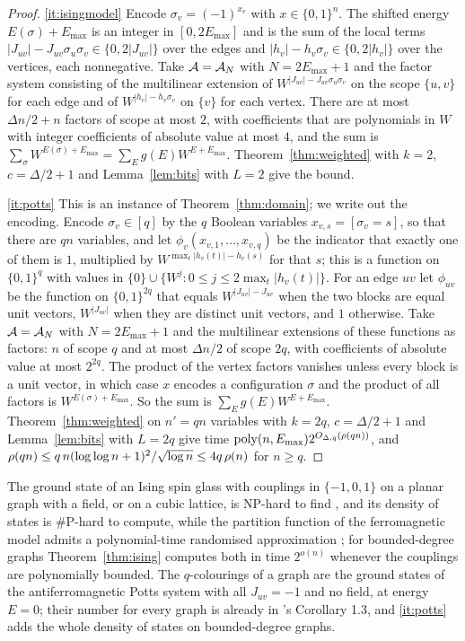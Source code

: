 \begin{proof}
\ref{it:isingmodel} Encode $\sigma_v=(-1)^{x_v}$ with $x\in\{0,1\}^n$. The shifted
energy $E(\sigma)+E_{\max}$ is an integer in $[0,2E_{\max}]$ and is the sum of the
local terms $|J_{uv}|-J_{uv}\sigma_u\sigma_v\in\{0,2|J_{uv}|\}$ over the edges
and $|h_v|-h_v\sigma_v\in\{0,2|h_v|\}$ over the vertices, each nonnegative.
Take $\mathcal{A}=\mathcal{A}_N$ with $N=2E_{\max}+1$ and the factor system consisting of the
multilinear extension of $W^{|J_{uv}|-J_{uv}\sigma_u\sigma_v}$ on the scope
$\{u,v\}$ for each edge and of $W^{|h_v|-h_v\sigma_v}$ on $\{v\}$ for each
vertex. There are at most $\Delta n/2+n$ factors of scope at most $2$, with
coefficients that are polynomials in $W$ with integer coefficients of absolute
value at most $4$, and the sum is $\sum_\sigma W^{E(\sigma)+E_{\max}}=\sum_Eg(E)W^{E+E_{\max}}$.
Theorem~\ref{thm:weighted} with $k=2$, $c=\Delta/2+1$ and Lemma~\ref{lem:bits}
with $L=2$ give the bound.

\ref{it:potts} This is an instance of Theorem~\ref{thm:domain}; we write out the encoding. Encode $\sigma_v\in[q]$ by the $q$ Boolean variables
$x_{v,s}=[\sigma_v=s]$, so that there are $qn$ variables, and let
$\phi_v(x_{v,1},\dots,x_{v,q})$ be the indicator that exactly one of them is $1$,
multiplied by $W^{\max_t|h_v(t)|-h_v(s)}$ for that $s$; this is a function on
$\{0,1\}^{q}$ with values in $\{0\}\cup\{W^{j}:0\le j\le2\max_t|h_v(t)|\}$. For an
edge $uv$ let $\phi_{uv}$ be the function on $\{0,1\}^{2q}$ that equals
$W^{|J_{uv}|-J_{uv}}$ when the two blocks are equal unit vectors, $W^{|J_{uv}|}$
when they are distinct unit vectors, and $1$ otherwise. Take $\mathcal{A}=\mathcal{A}_N$ with
$N=2E_{\max}+1$ and the multilinear extensions of these functions as factors:
$n$ of scope $q$ and at most $\Delta n/2$ of scope $2q$, with coefficients of
absolute value at most $2^{2q}$. The product of the vertex factors vanishes
unless every block is a unit vector, in which case $x$ encodes a configuration
$\sigma$ and the product of all factors is $W^{E(\sigma)+E_{\max}}$. So the sum
is $\sum_Eg(E)W^{E+E_{\max}}$. Theorem~\ref{thm:weighted} on $n'=qn$ variables
with $k=2q$, $c=\Delta/2+1$ and Lemma~\ref{lem:bits} with $L=2q$ give time
$\operatorname{poly}(n,E_{\max})2^{O_{\Delta,q}(\rho(qn))}$, and
$\rho(qn)\le q\,n(\log\log n+1)^2/\sqrt{\log n}\le4q\,\rho(n)$ for
$n\ge q$.
\end{proof}

\begin{remark}
The ground state of an Ising spin glass with couplings in $\{-1,0,1\}$ on a
planar graph with a field, or on a cubic lattice, is NP-hard to find
\cite{Barahona82}, and its density of states is $\#$P-hard to compute, while the partition function of the ferromagnetic model admits a polynomial-time randomised approximation \cite{JS93}; for
bounded-degree graphs Theorem~\ref{thm:ising} computes both in time $2^{o(n)}$
whenever the couplings are polynomially bounded. The $q$-colourings of a graph
are the ground states of the antiferromagnetic Potts system with all $J_{uv}=-1$
and no field, at energy $E=0$; their number for every graph is already in
\oai{}'s Corollary 1.3, and \ref{it:potts} adds the whole density of states on
bounded-degree graphs.
\end{remark}

